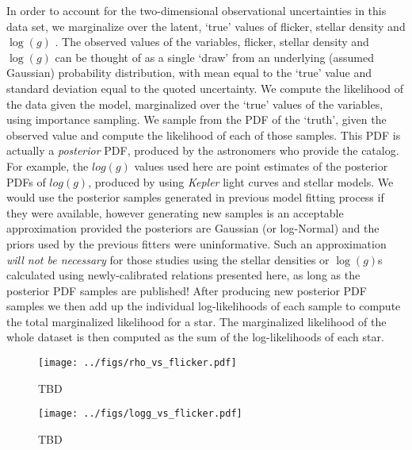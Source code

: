 In order to account for the two-dimensional observational uncertainties in
this data set, we marginalize over the latent, `true' values of flicker,
stellar density and $\log(g)$
\citep[see, e.g.][]{hogg:2010, foreman-mackey:2014, rogers:2015, angus:2015}.
The observed values of the variables, flicker, stellar density and $\log(g)$
can be thought of as a single `draw' from an underlying (assumed Gaussian)
probability distribution, with mean equal to the `true' value and standard
deviation equal to the quoted uncertainty.
We compute the likelihood of the data given the model, marginalized over the
`true' values of the variables, using importance sampling.
We sample from the PDF of the `truth', given the observed value and compute
the likelihood of each of those samples.
This PDF is actually a {\it posterior} PDF, produced by the astronomers who
provide the catalog.
For example, the $log(g)$ values used here are point estimates of the
posterior PDFs of $log(g)$, produced by \citet{chaplin:2014} using
{\it Kepler} light curves and stellar models.
We would use the posterior samples generated in previous model fitting process
if they were available, however generating new samples is an acceptable
approximation provided the posteriors are Gaussian (or log-Normal) and the
priors used by the previous fitters were uninformative.
Such an approximation {\it will not be necessary} for those studies using
the stellar densities or $\log(g)$s calculated using newly-calibrated relations
presented here, as long as the posterior PDF samples are published!
After producing new posterior PDF samples we then add up the individual log-likelihoods of each sample to compute the total marginalized likelihood for a star.
The marginalized likelihood of the whole dataset is then computed as the sum
of the log-likelihoods of each star.

\begin{figure}
\begin{center}
\texttt{[image: ../figs/rho\_vs\_flicker.pdf]}
\caption{
TBD
}
\label{fig:rhostar}
\end{center}
\end{figure}

\begin{figure}
\begin{center}
\texttt{[image: ../figs/logg\_vs\_flicker.pdf]}
\caption{
TBD
}
\label{fig:logg}
\end{center}
\end{figure}
